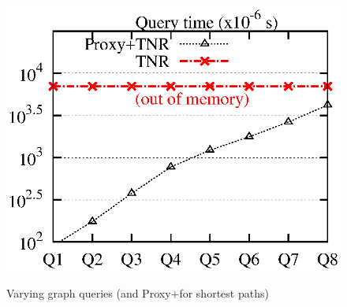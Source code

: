 \begin{figure}[t!]
\begin{center}
{\includegraphics[scale=0.422]{./exp/query_cus_path_tnr.eps}}
\end{center}
\vspace{-0.5ex}
\caption{Varying graph queries (\tnr and Proxy+\tnr for shortest paths)}
\label{fig:performance_path_queries_tnr}
\vspace{-1ex}
\end{figure}






